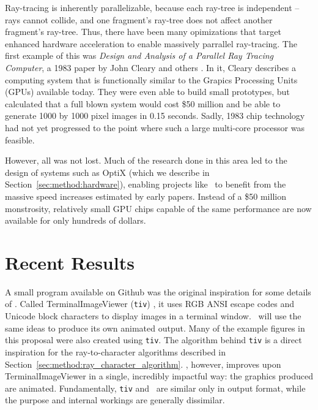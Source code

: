 
Ray-tracing is inherently parallelizable, because each ray-tree is independent -- rays cannot collide, and one fragment's ray-tree does not affect another fragment's ray-tree.
Thus, there have been many opimizations that target enhanced hardware acceleration to enable massively parrallel ray-tracing.
The first example of this was {\it Design and Analysis of a Parallel Ray Tracing Computer}, a 1983 paper by John Cleary and others \cite{cleary1983design}.
In it, Cleary describes a computing system that is functionally similar to the Grapics Processing Units (GPUs) available today.
They were even able to build small prototypes, but calculated that a full blown system would cost \$50 million and be able to generate 1000 by 1000 pixel images in 0.15 seconds.
Sadly, 1983 chip technology had not yet progressed to the point where such a large multi-core processor was feasible.

However, all was not lost.
Much of the research done in this area led to the design of systems such as OptiX \cite{parker2010optix} (which we describe in Section~\ref{sec:method:hardware}), enabling projects like \name\ to benefit from the massive speed increases estimated by early papers.
Instead of a \$50 million monstrosity, relatively small GPU chips capable of the same performance are now available for only hundreds of dollars.

\section{Recent Results}


A small program available on Github was the original inspiration for some details of \name.
Called TerminalImageViewer (\texttt{tiv}) \cite{tivGithub}, it uses RGB ANSI escape codes and Unicode block characters to display images in a terminal window.
\name\ will use the same ideas to produce its own animated output.
Many of the example figures in this proposal were also created using \texttt{tiv}.
The algorithm behind \texttt{tiv} is a direct inspiration for the ray-to-character algorithms described in Section~\ref{sec:method:ray_character_algorithm}.
\name, however, improves upon TerminalImageViewer in a single, incredibly impactful way: the graphics produced are animated.
Fundamentally, \texttt{tiv} and \name\ are similar only in output format, while the purpose and internal workings are generally dissimilar.

